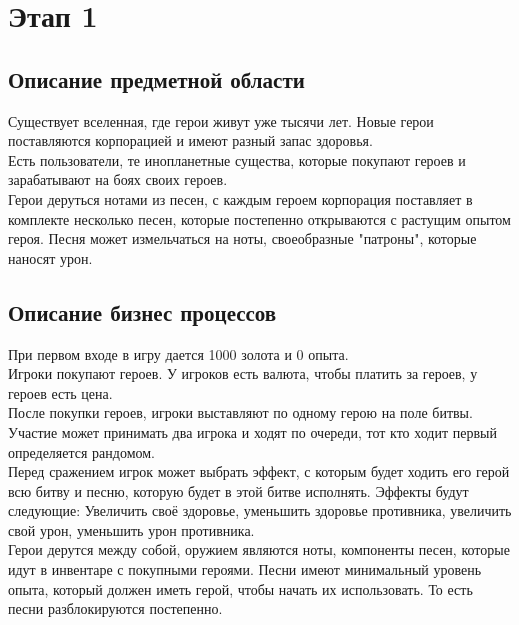 \section*{Этап 1}


\subsection*{Описание предметной области}

Существует вселенная, где герои живут уже тысячи лет. Новые герои поставляются корпорацией и имеют разный запас здоровья.\\

Есть пользователи, те инопланетные существа, которые покупают героев и зарабатывают на боях своих героев.\\

Герои деруться нотами из песен, с каждым героем корпорация поставляет в комплекте несколько песен, которые постепенно открываются с растущим опытом героя. Песня может измельчаться на ноты, своеобразные "патроны", которые наносят урон.


\subsection*{Описание бизнес процессов}


При первом входе в игру дается 1000 золота и 0 опыта.\\
    
Игроки покупают героев. У игроков есть валюта, чтобы платить за героев, у героев есть цена.\\

После покупки героев, игроки выставляют по одному герою на поле битвы. Участие может принимать два игрока и ходят по очереди, тот кто ходит первый определяется рандомом.\\

Перед сражением игрок может выбрать эффект, с которым будет ходить его герой всю битву и песню, которую будет в этой битве исполнять. Эффекты будут следующие: Увеличить своё здоровье, уменьшить здоровье противника, увеличить свой урон, уменьшить урон противника.\\

Герои дерутся между собой, оружием являются ноты, компоненты песен, которые идут в инвентаре с покупными героями. Песни имеют минимальный уровень опыта, который должен иметь герой, чтобы начать их использовать. То есть песни разблокируются постепенно.\\

